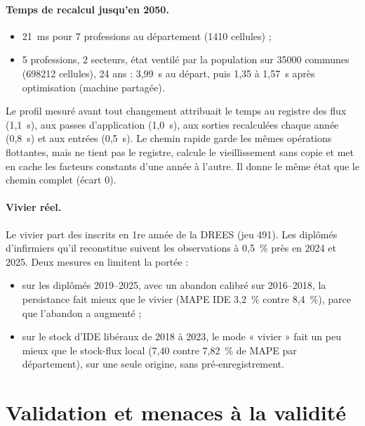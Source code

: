 \documentclass[11pt]{article}
\begin{document}
\paragraph{Temps de recalcul jusqu'en 2050.}
\begin{itemize}
  \item 21\mesure{}~ms pour 7 professions au département (\num{1410} cellules) ;
  \item 5 professions, 2 secteurs, état ventilé par la population sur \num{35000} communes
        (\num{698212} cellules), 24 ans : 3,99\mesure{}~s au départ, puis 1,35 à 1,57\mesure{}~s
        après optimisation (machine partagée).
\end{itemize}
Le profil mesuré avant tout changement attribuait le temps au registre des flux (1,1~s), aux passes
d'application (1,0~s), aux sorties recalculées chaque année (0,8~s) et aux entrées (0,5~s). Le chemin
rapide garde les mêmes opérations flottantes, mais ne tient pas le registre, calcule le vieillissement
sans copie et met en cache les facteurs constants d'une année à l'autre. Il donne le même état que le
chemin complet (écart 0).

\paragraph{Vivier réel.} Le vivier part des inscrits en 1re année de la DREES (jeu 491). Les diplômés
d'infirmiers qu'il reconstitue suivent les observations à 0,5~\% près en 2024 et 2025. Deux mesures en
limitent la portée :
\begin{itemize}
  \item sur les diplômés 2019--2025, avec un abandon calibré sur 2016--2018, la persistance fait mieux
        que le vivier (MAPE IDE 3,2\mesure{}~\% contre 8,4\mesure{}~\%), parce que l'abandon a
        augmenté ;
  \item sur le stock d'IDE libéraux de 2018 à 2023, le mode « vivier » fait un peu mieux que le
        stock-flux local (7,40\mesure{} contre 7,82\mesure{}~\% de MAPE par département), sur une
        seule origine, sans pré-enregistrement.
\end{itemize}

\section{Validation et menaces à la validité}\label{sec:validation}
\end{document}
